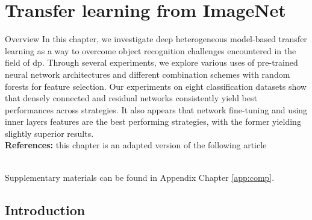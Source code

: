 \chapter{Transfer learning from ImageNet}
\label{chap:comp}



\begin{overview}{Overview}
    In this chapter, we investigate deep heterogeneous model-based transfer learning as a way to overcome object recognition challenges encountered in the field of \acrlong{dp}. Through several experiments, we explore various uses of pre-trained neural network architectures and different combination schemes with random forests for feature selection. Our experiments on eight classification datasets show that densely connected and residual networks consistently yield best performances across strategies. It also appears that network fine-tuning and using inner layers features are the best performing strategies, with the former yielding slightly superior results. \\

    \textbf{References:} this chapter is an adapted version of the following article 

     \\

    Supplementary materials can be found in Appendix Chapter \ref{app:comp}.
\end{overview}

\section{Introduction}


